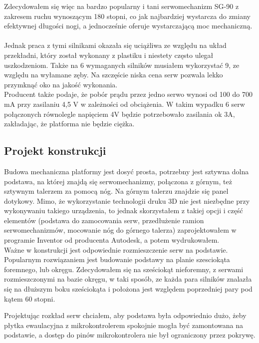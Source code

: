 Zdecydowałem się więc na bardzo popularny i tani serwomechanizm SG-90 z zakresem ruchu wynoszącym 180 stopni, co jak najbardziej wystarcza do zmiany efektywnej długości nogi, a jednocześnie oferuje wystarczającą moc mechaniczną. \\\\
 Jednak praca z tymi silnikami okazała się uciążliwa ze względu na układ przekładni, który został wykonany z plastiku i niestety często ulegał uszkodzeniom.
 Także na 6 wymaganych silników musiałem wykorzystać 9, ze względu na wyłamane zęby.
 Na szczęście niska cena serw pozwala lekko przymknąć oko na jakość wykonania. 
 \\
 Producent także podaje, że pobór prądu przez jedno serwo wynosi od 100 do 700 mA przy zasilaniu 4,5 V w zależności od obciążenia.
 W takim wypadku 6 serw połączonych równolegle napięciem 4V będzie potrzebowało zasilania ok 3A, zakładając, że platforma nie będzie ciężka.
 

\subsection{Projekt konstrukcji}
Budowa mechaniczna platformy jest dosyć prosta, potrzebny jest sztywna dolna podstawa, na której znajdą się serwomechanizmy, połączona z górnym, też sztywnym talerzem za pomocą nóg. 
Na górnym talerzu znajdzie się panel dotykowy.
Mimo, że wykorzystanie technologii druku 3D nie jest niezbędne przy wykonywaniu takiego urządzenia, to jednak skorzystałem z takiej opcji i część elementów (podstawa do zamocowania serw, przedłużenie ramion serwomechanizmów, mocowanie nóg do górnego talerza) zaprojektowałem w programie Inventor od producenta Autodesk, a potem wydrukowałem.
\\
Ważne w konstrukcji jest odpowiednie rozmieszczenie serw na podstawie.
Popularnym rozwiązaniem jest budowanie podstawy na planie szesciokąta foremnego, lub okręgu. 
Zdecydowałem się na sześciokąt nieforemny, z serwami rozmieszczonymi na bazie okręgu, w taki sposób, ze każda para silników znalazła się na dłuższym boku sześciokąta i położona jest względem poprzedniej pary pod kątem 60 stopni.

Projektując rozkład serw chciałem, aby podstawa była odpowiednio dużo, żeby płytka ewaulacyjna z mikrokontrolerem spokojnie mogła być zamontowana na podstawie, a dostęp do pinów mikrokontrolera nie był ograniczony przez pokrywę.


